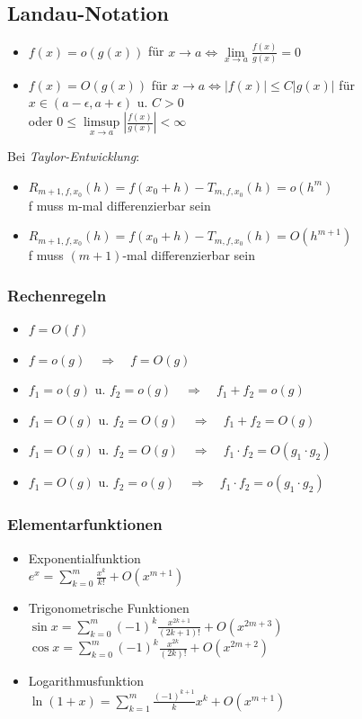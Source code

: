 \documentclass[6pt,a4paper]{scrartcl}
\newcommand{\abs}[1]{\ensuremath{\left\vert#1\right\vert}}
\begin{document}
\begin{multicols*}{4}
\subsection{Landau-Notation}
\begin{itemize}\itemsep-1pt
	\item $f(x) = o(g(x))$ für $x \rightarrow a \Leftrightarrow \lim\limits_{x \rightarrow a} \frac{f(x)}{g(x)} = 0$
	\item $f(x) = O(g(x))$ für $x \rightarrow a \Leftrightarrow |f(x)| \leq C|g(x)|$ für $x \in (a - \epsilon, a + \epsilon)$ u. $C > 0$\\ oder $0 \leq \limsup\limits_{x \rightarrow a} \abs{\frac{f(x)}{g(x)}} < \infty$
\end{itemize}
Bei \emph{Taylor-Entwicklung}:
\begin{itemize}\itemsep-1pt
	\item $R_{m+1,f,x_0}(h) = f(x_0 + h) - T_{m,f,x_0}(h) = o(h^m)$\\ f muss m-mal differenzierbar sein
	\item $R_{m+1,f,x_0}(h) = f(x_0 + h) - T_{m,f,x_0}(h) = O(h^{m+1})$\\ f muss $(m+1)$-mal differenzierbar sein
\end{itemize}
	\subsubsection{Rechenregeln}
	\begin{itemize}\itemsep-1pt
		\item $f = O(f)$
		\item $f = o(g) \quad\Rightarrow\quad f = O(g)$
		\item $f_1 = o(g)$ u. $f_2 = o(g) \quad\Rightarrow\quad f_1 + f_2 = o(g)$
		\item $f_1 = O(g)$ u. $f_2 = O(g) \quad\Rightarrow\quad f_1 + f_2 = O(g)$
		\item $f_1 = O(g)$ u. $f_2 = O(g) \quad\Rightarrow\quad f_1 \cdot f_2 = O(g_1 \cdot g_2)$
		\item $f_1 = O(g)$ u. $f_2 = o(g) \quad\Rightarrow\quad f_1 \cdot f_2 = o(g_1 \cdot g_2)$
	\end{itemize}
	\subsubsection{Elementarfunktionen}
	\begin{itemize}\itemsep-1pt
		\item Exponentialfunktion\\
		$e^x = \sum\limits_{k = 0}^m\frac{x^k}{k!} + O(x^{m + 1})$
		\item Trigonometrische Funktionen\\
		$\sin{x} = \sum\limits_{k = 0}^m(-1)^k\frac{x^{2k + 1}}{(2k + 1)!} + O(x^{2m + 3})$\\
		$\cos{x} = \sum\limits_{k = 0}^m(-1)^k\frac{x^{2k}}{(2k)!} + O(x^{2m + 2})$
		\item Logarithmusfunktion\\
		$\ln{(1 + x)} = \sum\limits_{k = 1}^m\frac{(-1)^{k + 1}}{k}x^k + O(x^{m + 1})$
	\end{itemize}



\end{multicols*}
\end{document}
